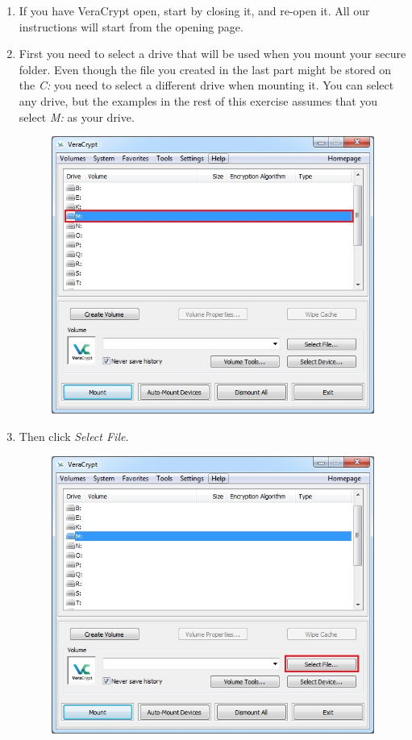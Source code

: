 \documentclass{tufte-handout}
\begin{document}
\begin{enumerate}
	\item If you have VeraCrypt open, start by closing it, and re-open it. All our instructions will start from the opening page.
	
	\item First you need to select a drive that will be used when you mount your secure folder. Even though the file you created in the last part might be stored on the \textit{C:} you need to select a different drive when mounting it. You can select any drive, but the examples in the rest of this exercise assumes that you select \textit{M:} as your drive.
	\begin{figure}%
		\includegraphics[width=.8\linewidth]{img/vc_mount_1.png}
	\end{figure}
	\FloatBarrier
	
	\item Then click \textit{Select File}.
	\begin{figure}%
		\includegraphics[width=.8\linewidth]{img/vc_mount_2.png}
	\end{figure}
	\FloatBarrier	
	

\end{enumerate}
\end{document}
